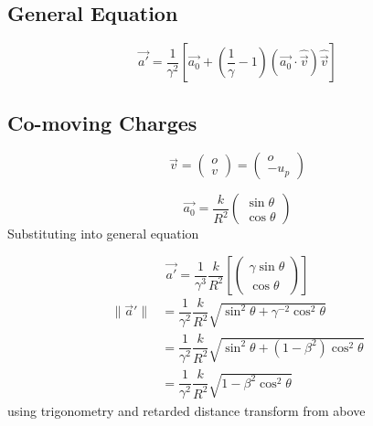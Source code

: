\subsection{General Equation}

\begin{equation}%
    \vec{a'} = \dfrac{1}{\gamma^2}\left[ \vec{a_0}+\left(\dfrac{1}{\gamma}-1\right)\left(\vec{a_0}\cdot\hat{\vec{v}}\right)\hat{\vec{v}}\right]
\end{equation}%

\subsection{Co-moving Charges}

\begin{equation}%
    \vec{v} =  \begin{pmatrix}
    o\\
    v
    \end{pmatrix} =
    \begin{pmatrix}
    o\\
    -u_p
    \end{pmatrix}
\end{equation}%

\begin{equation}%
    \vec{a_0} = \dfrac{k}{R^2} \begin{pmatrix}
    \sin\theta\\
    \cos{\theta}
    \end{pmatrix}
\end{equation}%
Substituting into general equation

\begin{equation}%
    \vec{a'} = \dfrac{1}{\gamma^3}\dfrac{k}{R^2}\left[ \begin{pmatrix}
    \gamma\sin\theta\\
     \cos{\theta}
    \end{pmatrix} \right]
\end{equation}%
\begin{equation}%
    \begin{aligned}
   \|\vec{a}'\| &=  \dfrac{1}{\gamma^2}\dfrac{k}{R^2}\sqrt{
    \sin^2\theta +
     \gamma^{-2}\cos^2{\theta}} \\
     &=  \dfrac{1}{\gamma^2}\dfrac{k}{R^2} \sqrt{
    \sin^2\theta +
     (1-\beta^2)\cos^2{\theta}} \\
     &=  \dfrac{1}{\gamma^2}\dfrac{k}{R^2} \sqrt{
    1 -\beta^2\cos^2{\theta}}
    \end{aligned}
\end{equation}%
using trigonometry and retarded distance transform from above

